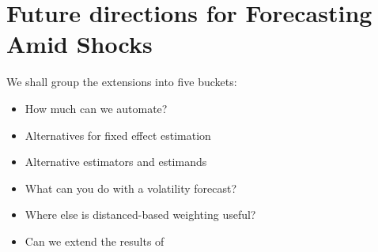 \documentclass[9pt]{beamer}
\theoremstyle{definition}
\begin{document}
    






\section{Future directions for Forecasting Amid Shocks}

\begin{frame}
We shall group the extensions into five buckets:
\begin{itemize}
    \item How much can we automate?
    \item Alternatives for fixed effect estimation
    \item Alternative estimators and estimands
    \item What can you do with a volatility forecast?
    \item Where else is distanced-based weighting useful?
    \item Can we extend the results of \parencite[][]{bodilsen2023exploiting}
\end{itemize}
\end{frame}
\end{document}
